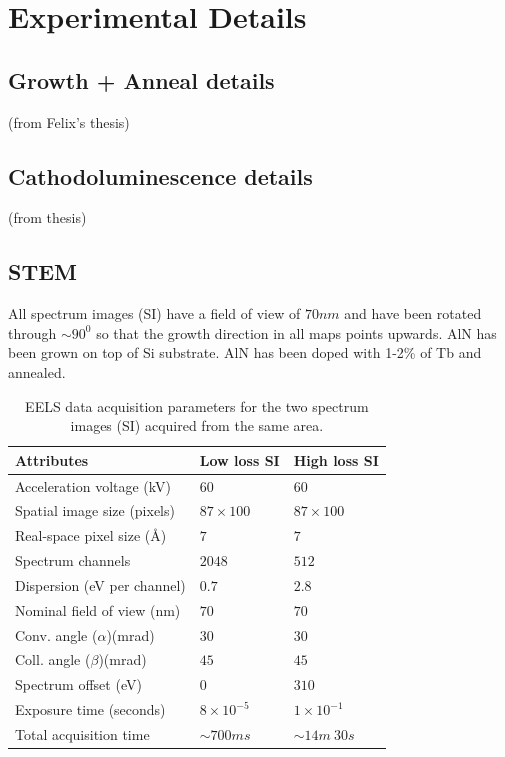 \documentclass[%
 aip,
rsi,%
 amsmath,amssymb,
 reprint,%
]{revtex4-1}
\begin{document}
\section{Experimental Details}
\label{sec:exp_detail}

\subsection{Growth + Anneal details}
\label{sec:growth}
(from Felix's thesis)

\subsection{Cathodoluminescence details}
\label{sec:CL}
(from thesis)

\subsection{STEM}
\label{sec:STEM}
All spectrum images (SI) have a field of view of $70nm$ and have been rotated through $\sim90^0$ so that the growth direction in all maps points upwards. AlN has been grown on top of Si substrate. AlN has been doped with 1-2\% of Tb and annealed.
\begin{table}[!ht]
	\caption{EELS data acquisition parameters for the two spectrum 	images (SI) acquired from the same area.}
    \label{tab:Attributes}
	\begin{ruledtabular}
		\begin{tabular}{lll}
			Attributes&Low loss SI&High loss SI							\\ \hline
            Acceleration voltage (kV) &$60$&$60$						\\
			Spatial image size (pixels)&$87\times100$&$87\times100$ 	\\
            Real-space pixel size (\AA)&$7$&$7$							\\
            Spectrum channels		&$2048$&$512$						\\
			Dispersion (eV per channel)&$0.7$&$2.8$						\\
			Nominal field of view (nm) &$70$&$70$						\\
			Conv. angle ($\alpha$)(mrad)&$30$&$30$						\\
			Coll. angle ($\beta$)(mrad)&$45$&$45$						\\
			Spectrum offset (eV)&$0$&$310$								\\
			Exposure time (seconds)&$8\times10^{-5}$&$1\times10^{-1}$	\\
			Total acquisition time &$\sim700ms$&$\sim14m~30s$
		\end{tabular}
	\end{ruledtabular}
\end{table}
\end{document}
